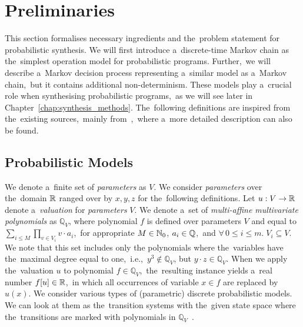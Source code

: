 \chapter{Preliminaries}\label{chap:preliminaries}

This section formalises necessary ingredients and the~problem statement for probabilistic synthesis.
We will first introduce a~discrete-time Markov chain as the~simplest operation model for probabilistic programs.
Further,~we will describe a~Markov decision process representing a~similar model as a~Markov chain,~but it contains additional non-determinism.
These models play a~crucial role when synthesising probabilistic programs,~as we will see later in Chapter~\ref{chap:synthesis_methods}.
The~following definitions are inspired from the~existing sources,~mainly from~\cite{tacas21,Quatmann2016},~where a~more detailed description can also be found.

\section{Probabilistic Models}

We denote a~finite set of \textit{parameters} as $V$.
We consider \textit{parameters} over the~domain $\mathbb{R}$ ranged over by $x,y,z$ for the~following definitions.
Let $u: V \rightarrow \mathbb{R}$ denote a~\textit{valuation} for \textit{parameters} $V$.
We denote a~set of \textit{multi-affine multivariate polynomials} as $\mathbb{Q}_V$, where polynomial $f$ is defined over parameters $V$ and equal to $\sum_{i \leq M}{\prod_{v\in V_i}v \cdot a_i}$,~for appropriate $M \in \mathbb{N}_0$, $a_i \in \mathbb{Q}$,~and $\forall \, 0 \leq i \leq m. \; V_i \subseteq V$.
We note that this set includes only the polynomials where the~variables have the~maximal degree equal to one,~i.e.,~$y^3 \notin \mathbb{Q}_V$, but $y \cdot z \in \mathbb{Q}_V$.
When we apply the~valuation $u$ to polynomial $f \in \mathbb{Q}_V$,~the~resulting instance yields a~real number $f[u] \in \mathbb{R}$,~in which all occurrences of variable $x \in f$ are replaced by $u(x)$.
We consider various types of (parametric) discrete probabilistic models.
We can look at them as the~transition systems with the~given state space where the~transitions are marked with polynomials in $\mathbb{Q}_V$~\cite{Quatmann2016}.

